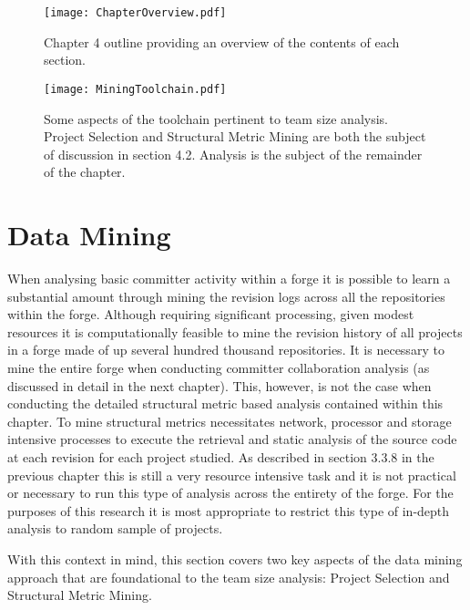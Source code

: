 \begin{landscape}
\begin{figure}[htbp!] 
\centering    
\texttt{[image: ChapterOverview.pdf]}
\caption{Chapter 4 outline providing an overview of the contents of each section.}
\label{fig:ChapterOverview}
\end{figure}
\end{landscape}

\begin{figure}[htbp!] 
\centering    
\texttt{[image: MiningToolchain.pdf]}
\caption[Some aspects of the toolchain pertinent to team size analysis.]{Some aspects of the toolchain pertinent to team size analysis. Project Selection and Structural Metric Mining are both the subject of discussion in section 4.2. Analysis is the subject of the remainder of the chapter.}
\label{fig:MiningToolchain}
\end{figure}
 

\section{Data Mining} %
When analysing basic committer activity within a forge it is possible to learn a substantial amount through mining the revision logs across all the repositories within the forge. Although requiring significant processing, given modest resources it is computationally feasible to mine the revision history of all projects in a forge made of up several hundred thousand repositories. It is necessary to mine the entire forge when conducting committer collaboration analysis (as discussed in detail in the next chapter). This, however, is not the case when conducting the detailed structural metric based analysis contained within this chapter. To mine structural metrics necessitates network, processor and storage intensive processes to execute the retrieval and static analysis of the source code at each revision for each project studied. As described in section 3.3.8 in the previous chapter this is still a very resource intensive task and it is not practical or necessary to run this type of analysis across the entirety of the forge. For the purposes of this research it is most appropriate to restrict this type of in-depth analysis to random sample of projects. 

With this context in mind, this section covers two key aspects of the data mining approach that are foundational to the team size analysis: Project Selection and Structural Metric Mining. 

